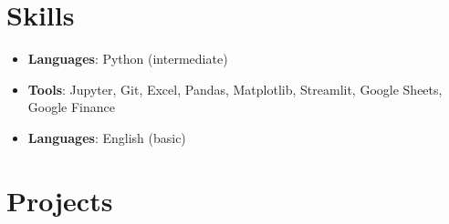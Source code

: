 \documentclass[11pt, a4paper]{article}
\begin{document}
\section*{Skills}
\begin{itemize}[leftmargin=*]
    \item \textbf{Languages}: Python (intermediate)
    \item \textbf{Tools}: Jupyter, Git, Excel, Pandas, Matplotlib, Streamlit, Google Sheets, Google Finance
    \item \textbf{Languages}: English (basic)
\end{itemize}

\section*{Projects}
\end{document}
